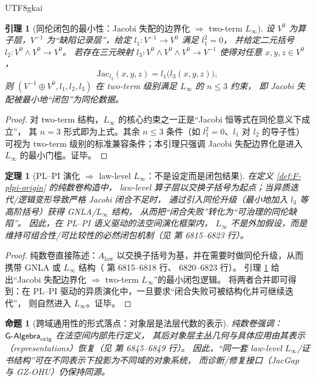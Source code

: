 \documentclass[12pt]{article}
\newtheorem{theorem}{定理}[section]
\newtheorem{proposition}{命题}[section]
\newtheorem{lemma}{引理}[section]
\begin{document}
\begin{CJK*}{UTF8}{gkai}
\begin{lemma}[同伦闭包的最小性：Jacobi 失配的边界化 $\Rightarrow$ two-term $L_\infty$]\label{lem:F-minimal-linfty}
设 $V^0$ 为算子层，$V^{-1}$ 为“缺陷记录层”，给定 $l_1:V^{-1}\to V^0$ 满足 $l_1^2=0$，
并给定二元括号 $l_2:V^0\wedge V^0\to V^0$。
若存在三元映射 $l_3:V^0\wedge V^0\wedge V^0\to V^{-1}$ 使得对任意 $x,y,z\in V^0$，
\[
  \mathrm{Jac}_{l_2}(x,y,z)=l_1\bigl(l_3(x,y,z)\bigr),
\]
则 $(V^{-1}\oplus V^0,l_1,l_2,l_3)$ 在 two-term 级别满足 $L_\infty$ 的 $n\le 3$ 约束，
即 Jacobi 失配被最小地“闭包”为同伦数据。
\end{lemma}

\begin{proof}
对 two-term 结构，$L_\infty$ 的核心约束之一正是“Jacobi 恒等式在同伦意义下成立”，
其 $n=3$ 形式即为上式。其余 $n\le 3$ 条件（如 $l_1^2=0$、$l_1$ 对 $l_2$ 的导子性）可视为
two-term 级别的标准兼容条件；本引理只强调 Jacobi 失配边界化是进入 $L_\infty$ 的最小门槛。证毕。
\end{proof}

\begin{theorem}[PL--PI 演化 $\Rightarrow$ law-level $L_\infty$：不是设定而是闭包结果]\label{thm:F-plpi-forces-linfty}
在定义 \ref{def:F-plpi-origin} 的纯数卷构造中，
law-level 算子层以交换子括号为起点；当异质迭代/逻辑变形导致严格 Jacobi 闭合不足时，
通过引入同伦升级（最小地加入 $l_3$ 等高阶括号）获得 GNLA/$L_\infty$ 结构，
从而把“闭合失败”转化为“可治理的同伦缺陷”。
因此，在 PL--PI 语义驱动的法空间演化框架内，
$L_\infty$ 不是外加假设，而是维持可组合性/可比较性的必然闭包机制（见 \cite{GaoZheng2025GFramework} 第 6815--6823 行）。
\end{theorem}

\begin{proof}
纯数卷直接陈述：$A_{\mathrm{law}}$ 以交换子括号为基，并在需要时做同伦升级，从而携带 GNLA 或 $L_\infty$ 结构（\cite{GaoZheng2025GFramework} 第 6815--6818 行、
  6820--6823 行）。
引理 \ref{lem:F-minimal-linfty} 给出“Jacobi 失配边界化 $\Rightarrow$ two-term $L_\infty$”的最小闭包逻辑。
将两者合并即可得到：在 PL--PI 驱动的异质演化中，一旦要求“闭合失败可被结构化并可继续迭代”，
则自然进入 $L_\infty$。证毕。
\end{proof}

\begin{proposition}[跨域通用性的形式落点：对象层是法层代数的表示]\label{prop:F-representation}
纯数卷强调：$\mathsf{G\text{-}Algebra}_{\mathrm{orig}}$ 在法空间内部先行定义，
其后对象层主丛几何与具体应用由其\emph{表示（representations）}恢复（见 \cite{GaoZheng2025GFramework} 第 6845--6849 行）。
因此，“同一套 law-level $L_\infty$/证书结构”可在不同表示下投影为不同域的对象系统，
而诊断/修复接口（JacGap 与 GZ-OHU）仍保持同源。
\end{proposition}


\end{CJK*}
\end{document}
